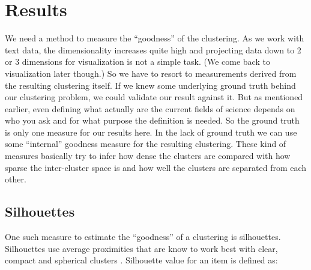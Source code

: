 \chapter{Results}
\label{chapter:results}

We need a method to measure the ``goodness'' of the clustering.
As we work with text data, the dimensionality increases
quite high and projecting data down to 2 or 3 dimensions for 
visualization is not a simple task. (We come back to visualization 
later though.)
So we have to resort to measurements derived from the 
resulting clustering itself. If we knew some underlying ground 
truth behind our clustering problem, we could validate our result 
against it. But as mentioned earlier, even defining what actually 
are the current fields of science depends on who you ask and for 
what purpose the definition is needed. So the ground truth is only
one measure for our results here.
In the lack of ground truth we can use some ``internal'' goodness 
measure for the resulting clustering. These kind of measures 
basically try to infer how dense the clusters are compared with how 
sparse the inter-cluster space is and how well the clusters are 
separated from each other.


\section{Silhouettes}
One such measure to estimate the ``goodness'' of a clustering is 
silhouettes. Silhouettes use average proximities that are know
to work best with clear, compact and spherical clusters
\cite{rousseeuw_silhouettes:_1987}. Silhouette value for an item
is defined as:

